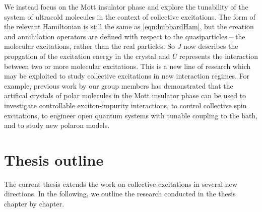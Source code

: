 We instead focus on the Mott insulator phase and explore the tunability of the system of ultracold molecules in the 
context of collective excitations. The form of the relevant Hamiltonian is still the same as \autoref{eqn:hubbardHam}, but the creation
and annihilation operators are defined with respect to the quasiparticles -- the molecular excitations, rather than the real 
particles.  So $J$ now describes the propgation of the excitation energy in the crystal and $U$ represents the interaction
between two or more molecular excitations. This is a new line of research which may be exploited to study collective 
excitations in new interaction regimes. For example, previous work by our group members has demonstrated
that the artifical crystals of polar molecules in the Mott insulator phase can be used to investigate controllable exciton-impurity interactions\cite{felipe},
to control collective spin excitations\cite{perez-rios2010}, to engineer open quantum systems with tunable coupling to the bath\cite{felipe-polarons}, and to study new polaron models\cite{felipe-arxive-polaron}. 


\section{Thesis outline}
\label{sec:outline}

The current thesis extends the work on collective excitations in several new directions. In the following, we outline the research conducted in the thesis chapter by chapter. 

